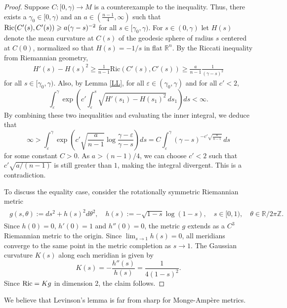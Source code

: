 \documentclass[11pt,reqno]{amsart}
\renewcommand{\geq}{\geqslant}
\theoremstyle{plain}
\theoremstyle{definition}
\numberwithin{equation}{section}
\begin{document}
\begin{proof}
Suppose $C: [0,\gamma) \to M$ is a counterexample to the inequality. Thus, there exists a $\gamma_0 \in [0,\gamma)$ and an $a \in (\frac{n-1}{4},\infty)$ such that ${\rm Ric}(C'(s),C'(s)) \geq a(\gamma -s)^{-2}$ for all $s \in [\gamma_0,\gamma)$. For $s \in (0,\gamma)$ let $H(s)$ denote the mean curvature at $C(s)$ of the geodesic sphere of radius $s$ centered at $C(0)$, normalized so that $H(s) = -1/s$ in flat $\mathbb{R}^n$. By the Riccati inequality from Riemannian geometry,
\begin{align*}
H'(s)-H(s)^2\geq
\frac{1}{n-1}\mathrm{Ric}(C'(s),C'(s)) \geq \frac{a}{n-1}\frac{1}{(\gamma-s)^2}
\end{align*}
for all $s \in [\gamma_0,\gamma)$. Also, by Lemma \ref{LL}, for all $\varepsilon \in (\gamma_0, \gamma)$ and for all $c'<2$,
$$\int_{\varepsilon}^{\gamma}\exp\left(c'\int_{\varepsilon}^{s}\sqrt{H'(s_{1})-H(s_{1})^{2}}\,ds_{1}\right)ds<\infty.$$
By combining these two inequalities and evaluating the inner integral, we deduce that
$$\infty > \int_\varepsilon^\gamma \exp \left(c'\sqrt{\frac{a}{n-1}} \log \frac{\gamma-\varepsilon}{\gamma - s}\right) ds = C \int_\varepsilon^\gamma (\gamma - s)^{-c'\sqrt{\frac{a}{n-1}}} \,ds$$
for some constant $C>0$. As $a > (n-1)/4$, we can choose $c'<2$ such that $c'\sqrt{a/(n-1)}$ is still greater than $1$, making the integral divergent. This is a contradiction.

To discuss the equality case, consider the rotationally symmetric Riemannian metric 
\begin{align*}\begin{split}g(s,\theta):=ds^2+h(s)^2d\theta^2, \quad h(s):=-\sqrt{1-s}\log(1-s), \quad s \in [0,1), \quad \theta \in \mathbb{R}/2\pi\mathbb{Z}.
\end{split}\end{align*}
Since $h(0)=0$, $h'(0)=1$ and $h''(0)=0$, the metric $g$ extends as a $C^3$ Riemannian metric to the origin. Since $\lim_{s\to 1} h(s)=0$, all meridians converge to the same point in the metric completion as $s \to 1$. The Gaussian curvature $K(s)$ along each meridian is given by
$$K(s)=-\frac{h''(s)}{h(s)} = \frac{1}{4(1-s)^2}.$$
Since ${\rm Ric} = Kg$ in dimension $2$, the claim follows.\end{proof}

We believe that Levinson's lemma is far from sharp for Monge-Ampère metrics.
\end{document}
